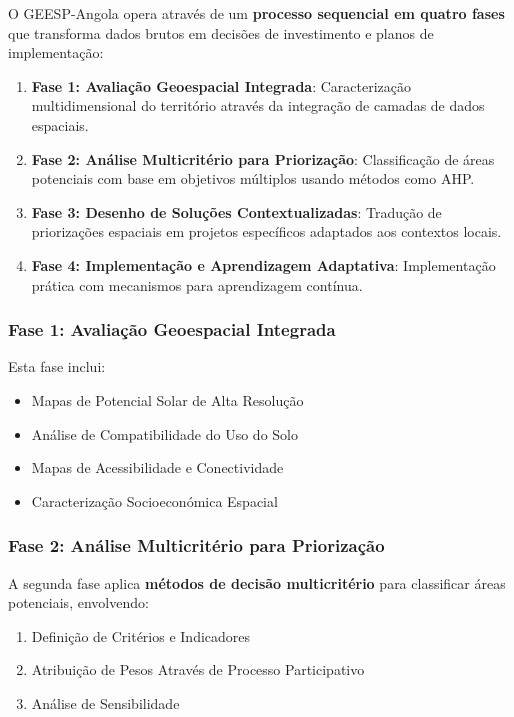 \documentclass[12pt, a4paper]{article}
\begin{document}
O GEESP-Angola opera através de um \textbf{processo sequencial em quatro fases} que transforma dados brutos em decisões de investimento e planos de implementação:

\begin{enumerate}
\item \textbf{Fase 1: Avaliação Geoespacial Integrada}: Caracterização multidimensional do território através da integração de camadas de dados espaciais.
\item \textbf{Fase 2: Análise Multicritério para Priorização}: Classificação de áreas potenciais com base em objetivos múltiplos usando métodos como AHP.
\item \textbf{Fase 3: Desenho de Soluções Contextualizadas}: Tradução de priorizações espaciais em projetos específicos adaptados aos contextos locais.
\item \textbf{Fase 4: Implementação e Aprendizagem Adaptativa}: Implementação prática com mecanismos para aprendizagem contínua.
\end{enumerate}

\subsubsection{Fase 1: Avaliação Geoespacial Integrada}

Esta fase inclui:
\begin{itemize}
\item Mapas de Potencial Solar de Alta Resolução
\item Análise de Compatibilidade do Uso do Solo
\item Mapas de Acessibilidade e Conectividade
\item Caracterização Socioeconómica Espacial
\end{itemize}

\subsubsection{Fase 2: Análise Multicritério para Priorização}

A segunda fase aplica \textbf{métodos de decisão multicritério} para classificar áreas potenciais, envolvendo:
\begin{enumerate}
\item Definição de Critérios e Indicadores
\item Atribuição de Pesos Através de Processo Participativo
\item Análise de Sensibilidade
\end{enumerate}
\end{document}
